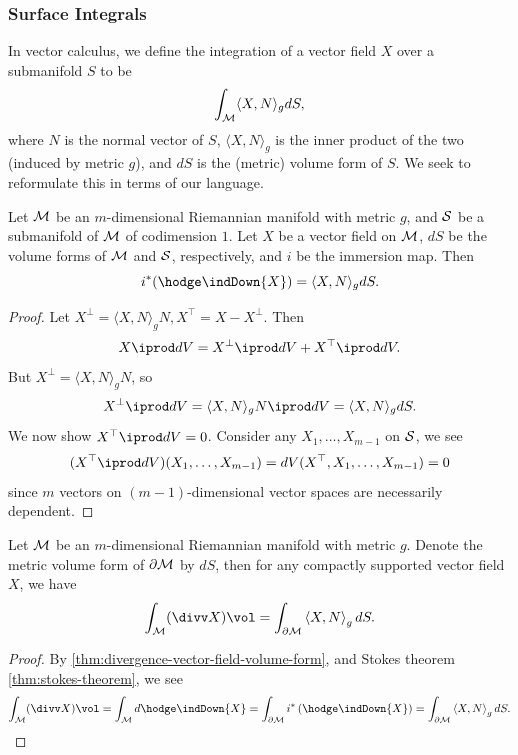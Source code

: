 \documentclass[../main.tex]{subfiles}
\begin{document}
    \subsubsection{Surface Integrals}
    \begin{remark}
        In vector calculus, we define the integration of a vector field \(X\) over a 
        submanifold \(S\) to be 
        \[
        \int_{\manifold[M]} \langle X, N\rangle_g dS,
        \]
        where \(N\) is the normal vector of \(S\), \(\langle X, N\rangle_g\) is the 
        inner product of the two (induced by metric \(g\)), and \(dS\) is the (metric) 
        volume form of \(S\). We seek to reformulate this in terms of our language.
    \end{remark}
    \begin{theorem}\label{thm:hodge-flux}
        Let \(\manifold[M]\) be an \(m\)-dimensional Riemannian manifold with metric 
        \(g\), and \(\manifold[S]\) be a submanifold of \(\manifold[M]\) of 
        codimension \(1\).
        Let \(X\) be a vector field on \(\manifold[M]\), \(dS\) be the 
        volume forms of \(\manifold[M]\) and \(\manifold[S]\), respectively, 
        and \(i\) be the immersion map. Then 
        \[
        i^*(\hodge \indDown{X})=\langle X, N\rangle_g dS.
        \]
    \end{theorem}
    \begin{proof}
        Let \(X^\perp = \langle X, N\rangle_gN, X^{\top}=X-X^\perp\). Then 
        \[
        X\iprod dV = X^\perp \iprod dV + X ^{\top} \iprod dV.
        \]
        But \(X^\perp = \langle X, N\rangle_gN\), so 
        \[
        X^\perp \iprod dV = \langle X, N\rangle_gN\iprod dV
        = \langle X, N\rangle_g dS.
        \]
        We now show \(X ^{\top} \iprod dV=0\). Consider any \(X_1, \dots, X_{m-1}\) 
        on \(\manifold[S]\), we see 
        \[
        (X ^{\top} \iprod dV)(X_1, \dots, X_{m-1})
        = dV(X^{\top}, X_1, \dots, X_{m-1})=0
        \]
        since \(m\) vectors on \((m-1)\)-dimensional vector spaces are necessarily 
        dependent.
    \end{proof}
    \begin{theorem}\label{thm:divergence-theorem}
        Let \(\manifold[M]\) be an \(m\)-dimensional Riemannian manifold with metric 
        \(g\). Denote the metric volume form of \(\partial \manifold[M]\) by 
        \(dS\), then for any compactly supported vector field \(X\), we have 
        \[
        \int_{\manifold[M]} (\divv X)\vol=\int_{\partial \manifold[M]} 
        \left<X, N\right>_g dS.
        \]
    \end{theorem}
    \begin{proof}
        By \cref{thm:divergence-vector-field-volume-form}, and Stokes theorem 
        \cref{thm:stokes-theorem}, we see 
        \[
        \int_{\manifold[M]} (\divv X)\vol = \int_{\manifold[M]} d\hodge\indDown{X}
        =\int_{\partial \manifold[M]}i^*\left(\hodge \indDown{X}\right)
        =\int_{\partial \manifold[M]}\left<X, N\right>_g dS.
        \]
    \end{proof}
\end{document}
